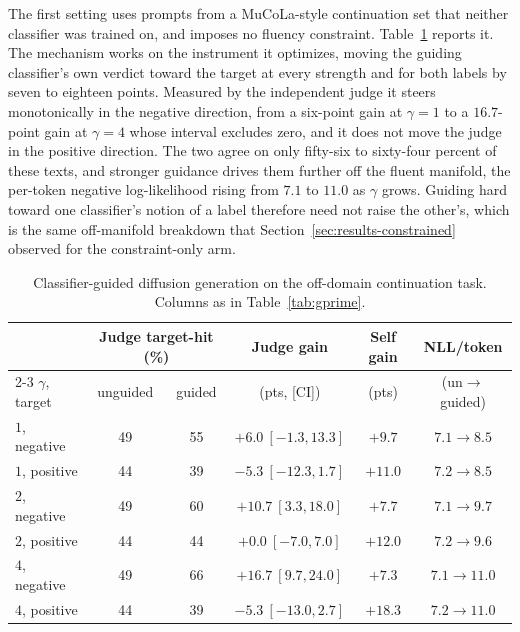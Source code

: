 The first setting uses prompts from a MuCoLa-style continuation set that neither classifier
was trained on, and imposes no fluency constraint. Table~\ref{tab:diffusion-guided} reports
it. The mechanism works on the instrument it optimizes, moving the guiding classifier's own
verdict toward the target at every strength and for both labels by seven to eighteen points.
Measured by the independent judge it steers monotonically in the negative direction, from a
six-point gain at $\gamma=1$ to a $16.7$-point gain at $\gamma=4$ whose interval excludes zero,
and it does not move the judge in the positive direction. The two agree on only fifty-six to
sixty-four percent of these texts, and stronger guidance drives them further off the fluent
manifold, the per-token negative log-likelihood rising from $7.1$ to $11.0$ as $\gamma$ grows.
Guiding hard toward one classifier's notion of a label therefore need not raise the other's,
which is the same off-manifold breakdown that Section~\ref{sec:results-constrained} observed
for the constraint-only arm.

\begin{table}[htbp]
    \centering
    \small
    \begin{tabular}{lccccc}
        \toprule
        & \multicolumn{2}{c}{Judge target-hit (\%)} & Judge gain & Self gain & NLL/token \\
        \cmidrule(lr){2-3}
        $\gamma$, target & unguided & guided & (pts, [CI]) & (pts) & (un$\to$guided) \\
        \midrule
        $1$, negative & 49 & 55 & $+6.0\ [-1.3,13.3]$ & $+9.7$ & $7.1\to8.5$ \\
        $1$, positive & 44 & 39 & $-5.3\ [-12.3,1.7]$ & $+11.0$ & $7.2\to8.5$ \\
        $2$, negative & 49 & 60 & $+10.7\ [3.3,18.0]$ & $+7.7$ & $7.1\to9.7$ \\
        $2$, positive & 44 & 44 & $+0.0\ [-7.0,7.0]$ & $+12.0$ & $7.2\to9.6$ \\
        $4$, negative & 49 & 66 & $+16.7\ [9.7,24.0]$ & $+7.3$ & $7.1\to11.0$ \\
        $4$, positive & 44 & 39 & $-5.3\ [-13.0,2.7]$ & $+18.3$ & $7.2\to11.0$ \\
        \bottomrule
    \end{tabular}
    \caption[Off-domain classifier-guided diffusion generation.]{Classifier-guided diffusion generation on the off-domain continuation task. Columns as in Table~\ref{tab:gprime}.}
    \label{tab:diffusion-guided}
\end{table}


